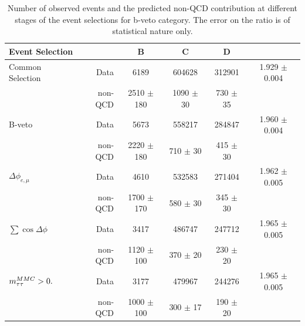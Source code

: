 \begin{table} [!tp]
\begin{small}
	\begin{tabular}[c]{l r c c c c}
\hline
\hline 
Event Selection  &  		& B & C & D &  \rqcd \\ 
\hline
Common Selection 	&   Data	&6189			&604628			&312901		    &	1.929 $\pm$  	0.004		\\
	        &   non-QCD	&2510 $\pm$  180  	&1090 $\pm$   30  	&730	$\pm$ 35    &				\\
\hline
B-veto	     	&   Data	&5673		  & 558217 		& 284847		    &	1.960	$\pm$	0.004	\\
	     	&   non-QCD	&2220	$\pm$ 180 & 710 $\pm$ 30	& 415 $\pm$	30	    &				\\
\hline
$\Delta\phi_{e,\mu}$  &   Data		&4610		&532583 		&271404		    	    &	1.962	$\pm$	0.005	\\
	     &   non-QCD	&1700 $\pm$170	&580 $\pm$	30	& 345 $\pm$	30	    &				\\
\hline
$\sum\cos\Delta\phi$ &   Data& 3417	&486747 		& 247712	   		    &	1.965	$\pm$	0.005 	\\
	     &   non-QCD     & 1120  $\pm$ 100	& 370 $\pm$ 	20		& 230 $\pm$	20  &				\\
\hline
$m_{\tau\tau}^{MMC} > 0.$    &  Data		& 3177		& 479967 		& 244276	    	    &	1.965	$\pm$	0.005	\\
	     &   non-QCD	& 1000 $\pm$ 100	& 300  $\pm$ 17		&190	$\pm$ 20    &			\\[1ex]
\hline
\hline
	\end{tabular}
\end{small}
	\caption{Number of observed events and the predicted non-QCD contribution at different stages of the event selections for b-veto category. 
	The error on the \rqcd ratio is of statistical nature only.}
	\centering
	\label{table:qcd_yield_bveto}
\end{table}

